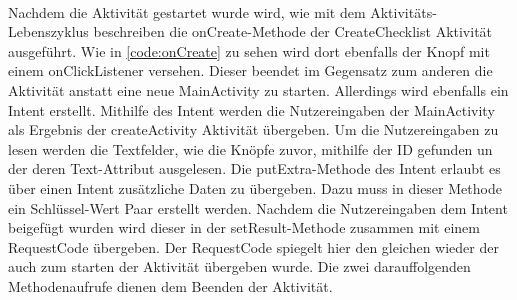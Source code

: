 \\


Nachdem die Aktivität gestartet wurde wird, wie mit dem Aktivitäts-Lebenszyklus beschreiben die onCreate-Methode der CreateChecklist Aktivität ausgeführt. Wie in \autoref{code:onCreate} zu sehen wird dort ebenfalls der Knopf mit einem onClickListener versehen. Dieser beendet im Gegensatz zum anderen die Aktivität anstatt eine neue MainActivity zu starten. Allerdings wird ebenfalls ein Intent erstellt. Mithilfe des Intent werden die Nutzereingaben der MainActivity als Ergebnis der createActivity Aktivität übergeben. Um die Nutzereingaben zu lesen werden die Textfelder, wie die Knöpfe zuvor, mithilfe der ID gefunden un der deren Text-Attribut ausgelesen. Die putExtra-Methode des Intent erlaubt es über einen Intent zusätzliche Daten zu übergeben. Dazu muss in dieser Methode ein Schlüssel-Wert Paar erstellt werden. Nachdem die Nutzereingaben dem Intent beigefügt wurden wird dieser in der setResult-Methode zusammen mit einem RequestCode übergeben. Der RequestCode spiegelt hier den gleichen wieder der auch zum starten der Aktivität übergeben wurde. Die zwei darauffolgenden Methodenaufrufe dienen dem Beenden der Aktivität.
